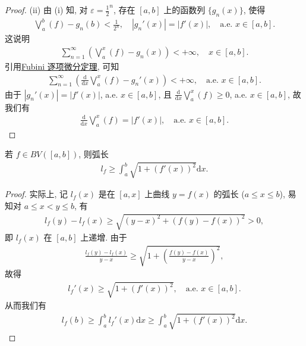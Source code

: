 \documentclass[../../main.tex]{subfiles}%
\begin{document}
\begin{proof}
(ii) 由 (i) 知, 对 $\varepsilon=\frac{1}{2}^n$, 存在 $[a,b]$ 上的函数列 $\{g_n(x)\}$, 使得
\begin{align*}
\bigvee_a^b(f) - g_n(b) < \frac{1}{2^n}, \quad |g_n'(x)| = |f'(x)|, \quad \text{a.e. } x\in[a,b].
\end{align*}
这说明
\begin{align*}
\sum_{n=1}^\infty \left(\bigvee_a^x(f) - g_n(x)\right) < +\infty, \quad x\in[a,b].
\end{align*}
引用\hyperref[theorem:实变函数--Fubini 逐项微分定理]{Fubini 逐项微分定理}, 可知
\begin{align*}
\sum_{n=1}^\infty \left(\frac{\mathrm{d}}{\mathrm{d}x}\bigvee_a^x(f) - g_n'(x)\right) < +\infty, \quad \text{a.e. } x\in[a,b].
\end{align*}
由于 $|g_n'(x)|=|f'(x)|$, a.e. $x\in[a,b]$, 且 $\frac{\mathrm{d}}{\mathrm{d}x}\bigvee_a^x(f)\geqslant 0$, a.e. $x\in[a,b]$, 故我们有
\begin{align*}
\frac{\mathrm{d}}{\mathrm{d}x}\bigvee_a^x(f) = |f'(x)|, \quad \text{a.e. } x\in[a,b].
\end{align*}
\end{proof}

\begin{proposition}\label{proposition:实变函数--弧长公式1}
若 $f\in BV([a,b])$, 则弧长
\begin{align*}
l_f \geqslant \int_a^b \sqrt{1+(f'(x))^2}\mathrm{d}x.
\end{align*}
\end{proposition}
\begin{proof}
实际上, 记 $l_f(x)$ 是在 $[a,x]$ 上曲线 $y=f(x)$ 的弧长 ($a\leqslant x\leqslant b$), 易知对 $a\leqslant x<y\leqslant b$, 有
\begin{align*}
l_f(y)-l_f(x) \geqslant \sqrt{(y-x)^2+(f(y)-f(x))^2} > 0,
\end{align*}
即 $l_f(x)$ 在 $[a,b]$ 上递增. 由于
\begin{align*}
\frac{l_f(y)-l_f(x)}{y-x} \geqslant \sqrt{1+\left(\frac{f(y)-f(x)}{y-x}\right)^2},
\end{align*}
故得
\begin{align*}
l_f'(x) \geqslant \sqrt{1+(f'(x))^2}, \quad \text{a.e. } x\in[a,b].
\end{align*}
从而我们有
\begin{align*}
l_f(b) \geqslant \int_a^b l_f'(x)\mathrm{d}x \geqslant \int_a^b \sqrt{1+(f'(x))^2}\mathrm{d}x.
\end{align*}
\end{proof}
\end{document}
